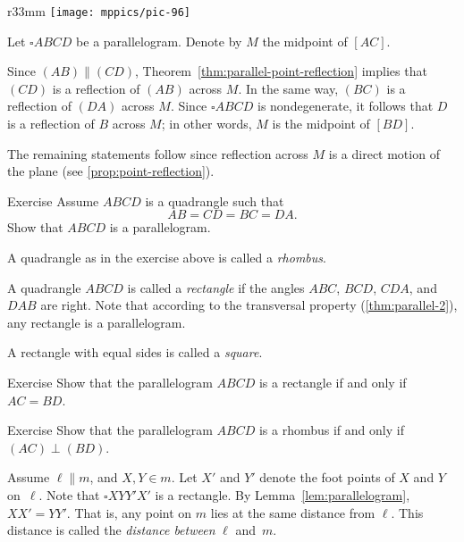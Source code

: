 {

\begin{wrapfigure}{r}{33mm}
\centering
\texttt{[image: mppics/pic-96]}
\end{wrapfigure}

 Let $\square A B C D$ be a parallelogram.
Denote by $M$ the midpoint of $[AC]$.

Since $(AB)\parallel (CD)$, Theorem~\ref{thm:parallel-point-reflection} implies that $(CD)$ is a reflection of $(AB)$ across $M$.
In the same way, $(BC)$ is a reflection of $(DA)$ across $M$.
Since $\square A B C D$ is nondegenerate, it follows that $D$ is a reflection of $B$ across $M$; in other words, $M$ is the midpoint of $[BD]$.

The remaining statements follow since reflection across $M$ is a direct motion of the plane (see \ref{prop:point-reflection}).
\qeds

}

\begin{thm}{Exercise}\label{ex:romb}
Assume $ABCD$ is a quadrangle such that
\[AB=CD=BC=DA.\]
Show that $ABCD$ is a parallelogram.
\end{thm}

A quadrangle as in the exercise above is called a \emph{rhombus}.

A quadrangle $ABCD$ is called a \emph{rectangle} if the angles $ABC$, $BCD$, $CDA$, and $DAB$ are right.
Note that according to the transversal property (\ref{thm:parallel-2}),
any rectangle is a parallelogram.

A rectangle with equal sides is called a \emph{square}.

\begin{thm}{Exercise}\label{ex:rectangle}
Show that the parallelogram $ABCD$ is a rectangle
if and only if $AC=BD$.
\end{thm}

\begin{thm}{Exercise}\label{ex:romb2}
Show that the parallelogram $ABCD$ is a rhombus
if and only if $(AC)\perp (BD)$.
\end{thm}

Assume $\ell\parallel m$, and $X,Y\in m$.
Let $X'$ and $Y'$ denote the foot points of $X$ and $Y$ on~$\ell$.
Note that $\square XYY'X'$ is a rectangle.
By Lemma~\ref{lem:parallelogram}, $XX'=YY'$.
That is, any point on $m$ lies at the same distance from $\ell$.
This distance is called the \emph{distance between} $\ell$ and~$m$.


